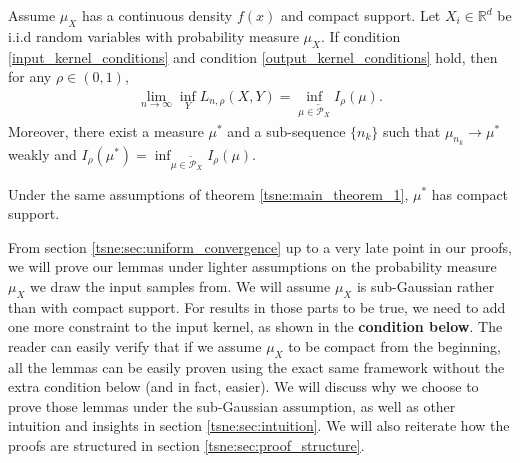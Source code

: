 \begin{theorem} \label{tsne:main_theorem_1}
    Assume $\mu_X$ has a continuous density $f(x)$ and compact support. Let $X_i \in \mathbb{R}^d$ be i.i.d random variables with probability measure $\mu_X$. If condition \ref{input_kernel_conditions} and condition \ref{output_kernel_conditions} hold, then for any $\rho \in (0,1)$,
    \begin{align}
        \lim_{n \to \infty} \inf_Y L_{n,\rho}(X,Y) = \inf_{\mu \in \tilde{\mathcal{P}}_X} I_{\rho}(\mu).
    \end{align}
    Moreover, there exist a measure $\mu^*$ and a sub-sequence $\{n_k\}$ such that $\mu_{n_k} \to \mu^*$ weakly and $I_{\rho}(\mu^*) = \inf_{\mu \in \tilde{\mathcal{P}}_X} I_{\rho}(\mu)$.
\end{theorem}
\begin{theorem} \label{tsne:main_theorem_2}
    Under the same assumptions of theorem \ref{tsne:main_theorem_1}, $\mu^*$ has compact support.
\end{theorem}

From section \ref{tsne:sec:uniform_convergence} up to a very late point in our
proofs, we will prove our lemmas under lighter assumptions on the probability
measure $\mu_X$ we draw the input samples from. We will assume $\mu_X$ is
sub-Gaussian rather than with compact support. For results in those parts to be
true, we need to add one more constraint to the input kernel, as shown in the
\textbf{condition below}. The reader can easily verify that if we assume
$\mu_X$ to be compact from the beginning, all the lemmas can be easily proven
using the exact same framework without the extra condition below (and in fact,
easier). We will discuss why we choose to prove those lemmas under the
sub-Gaussian assumption, as well as other intuition and insights in section
\ref{tsne:sec:intuition}. We will also reiterate how the proofs are structured
in section \ref{tsne:sec:proof_structure}.

